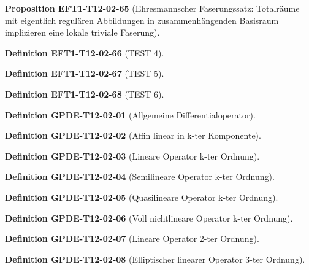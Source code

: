 \documentclass[10pt, letterpaper]{article}
\newcommand{\CustomHeading}[3]{%
  \par\medskip\noindent%
  \textbf{#1 #2} \textnormal{(#3)}.\enskip%
}
\newenvironment{DEF}[2]{\CustomHeading{Definition}{#1}{#2}}{}
\newenvironment{PROP}[2]{\CustomHeading{Proposition}{#1}{#2}}{}
\begin{document}
\begin{PROP}{EFT1-T12-02-65}{Ehresmannscher Faserungssatz: Totalräume mit eigentlich regulären Abbildungen in zusammenhängenden Basisraum implizieren eine lokale triviale Faserung}
\end{PROP}

\begin{DEF}{EFT1-T12-02-66}{TEST 4}
\end{DEF}

\begin{DEF}{EFT1-T12-02-67}{TEST 5}
\end{DEF}

\begin{DEF}{EFT1-T12-02-68}{TEST 6}
\end{DEF}

\begin{DEF}{GPDE-T12-02-01}{Allgemeine Differentialoperator}
\end{DEF}

\begin{DEF}{GPDE-T12-02-02}{Affin linear in k-ter Komponente}
\end{DEF}

\begin{DEF}{GPDE-T12-02-03}{Lineare Operator k-ter Ordnung}
\end{DEF}

\begin{DEF}{GPDE-T12-02-04}{Semilineare Operator k-ter Ordnung}
\end{DEF}

\begin{DEF}{GPDE-T12-02-05}{Quasilineare Operator k-ter Ordnung}
\end{DEF}

\begin{DEF}{GPDE-T12-02-06}{Voll nichtlineare Operator k-ter Ordnung}
\end{DEF}

\begin{DEF}{GPDE-T12-02-07}{Lineare Operator 2-ter Ordnung}
\end{DEF}

\begin{DEF}{GPDE-T12-02-08}{Elliptischer linearer Operator 3-ter Ordnung}
\end{DEF}
\end{document}
